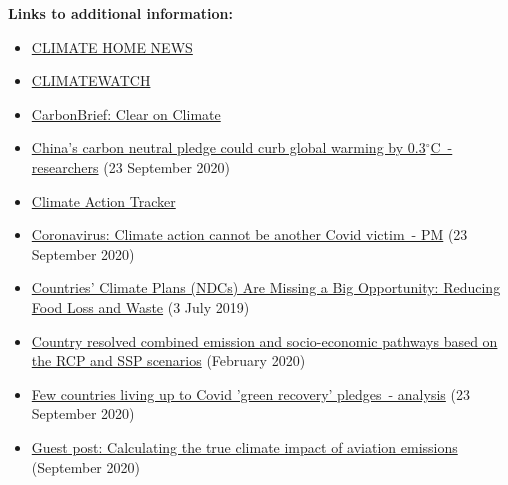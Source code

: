 \documentclass[12pt]{article}
\begin{document}
 \noindent \textbf{Links to additional information:}
 \begin{itemize}
 \item \href{https://www.climatechangenews.com/}{CLIMATE HOME NEWS} 
 \vspace{-.2cm} \item \href{https://www.climatewatchdata.org/}{CLIMATEWATCH} 
 \vspace{-.2cm} \item \href{https://www.carbonbrief.org/}{CarbonBrief: Clear on Climate} 
 \vspace{-.2cm} \item \href{https://uk.reuters.com/article/us-climate-change-china/chinas-carbon-neutral-pledge-could-curb-global-warming-by-0-3c-researchers-idUKKCN26E325?utm_campaign=Carbon\%20Brief\%20Daily\%20Briefing&utm_medium=email&utm_source=Revue\%20newsletter}{China's carbon neutral pledge could curb global warming by 0.3$^{\circ}$C~- researchers} (23 September 2020)
 \vspace{-.2cm} \item \href{https://climateactiontracker.org/}{Climate Action Tracker} 
 \vspace{-.2cm} \item \href{https://www.bbc.com/news/science-environment-54274644?utm_campaign=Carbon\%20Brief\%20Daily\%20Briefing&utm_medium=email&utm_source=Revue\%20newsletter}{Coronavirus: Climate action cannot be another Covid victim~- PM} (23 September 2020)
 \vspace{-.2cm} \item \href{https://www.wri.org/blog/2019/07/countries-climate-plans-ndcs-are-missing-big-opportunity-reducing-food-loss-and-waste}{Countries' Climate Plans (NDCs) Are Missing a Big Opportunity: Reducing Food Loss and Waste} (3 July 2019)
 \vspace{-.2cm} \item \href{https://zenodo.org/record/3638137#.X2sqPIuxU2w}{Country resolved combined emission and socio-economic pathways based on the RCP and SSP scenarios} (February 2020)
 \vspace{-.2cm} \item \href{https://www.theguardian.com/environment/2020/sep/23/few-countries-living-up-to-green-recovery-promises-analysis?utm_campaign=Carbon\%20Brief\%20Daily\%20Briefing&utm_medium=email&utm_source=Revue\%20newsletter}{Few countries living up to Covid 'green recovery' pledges~- analysis} (23 September 2020)
 \vspace{-.2cm} \item \href{https://www.carbonbrief.org/guest-post-calculating-the-true-climate-impact-of-aviation-emissions?utm_campaign=Carbon\%20Brief\%20Daily\%20Briefing&utm_medium=email&utm_source=Revue\%20newsletter}{Guest post: Calculating the true climate impact of aviation emissions} (September 2020)

\end{itemize}
\end{document}
